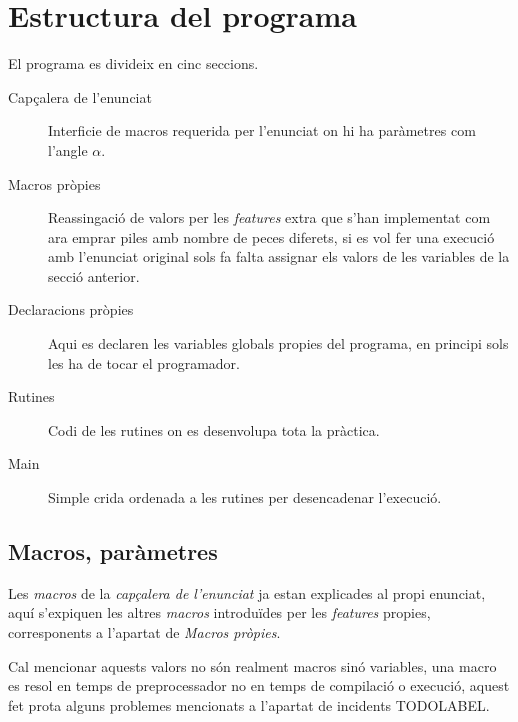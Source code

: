\section{Estructura del programa}
El programa es divideix en cinc seccions.

\begin{description}
\item [Capçalera de l'enunciat] Interficie de macros requerida per l'enunciat
on hi ha paràmetres com l'angle $\alpha$.
\item [Macros pròpies] Reassingació de valors per les \emph{features} extra que
s'han implementat com ara emprar
piles amb nombre de peces diferets, si es vol fer una execució amb l'enunciat
original sols fa falta
assignar els valors de les variables de la secció anterior.
\item [Declaracions pròpies] Aqui es declaren les variables globals propies
del programa, en principi sols les 
ha de tocar el programador.
\item [Rutines] Codi de les rutines on es desenvolupa tota la pràctica.
\item [Main] Simple crida ordenada a les rutines per desencadenar l'execució.
\end{description}

\subsection{Macros, paràmetres}
Les \emph{macros} de la \emph{capçalera de l'enunciat} ja estan explicades al
propi enunciat, aquí s'expiquen les
altres \emph{macros} introduïdes per les \emph{features} propies, corresponents
a l'apartat de \emph{Macros pròpies}.

Cal mencionar aquests valors no són realment macros sinó variables, una macro
es resol en temps de preprocessador no en temps de compilació o execució,
aquest fet prota alguns problemes mencionats a l'apartat de incidents TODOLABEL.

